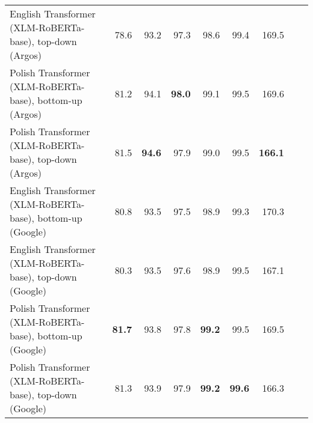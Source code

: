 \begin{table}[ht!]
{\begin{tabular}{lrrrrrrrr}
  English Transformer (XLM-RoBERTa-base), top-down (Argos) & 78.6 & 93.2 & 97.3 & 98.6 & 99.4 & 169.5 \\ 
  Polish Transformer (XLM-RoBERTa-base), bottom-up (Argos) & 81.2 & 94.1 & \textbf{98.0} & 99.1 & 99.5 & 169.6 \\ 
  Polish Transformer (XLM-RoBERTa-base), top-down (Argos) & 81.5 & \textbf{94.6} & 97.9 & 99.0 & 99.5 & \textbf{166.1} \\ 
  English Transformer (XLM-RoBERTa-base), bottom-up (Google) & 80.8 & 93.5 & 97.5 & 98.9 & 99.3 & 170.3 \\ 
  English Transformer (XLM-RoBERTa-base), top-down (Google) & 80.3 & 93.5 & 97.6 & 98.9 & 99.5 & 167.1 \\ 
  Polish Transformer (XLM-RoBERTa-base), bottom-up (Google) & \textbf{81.7} & 93.8 & 97.8 & \textbf{99.2} & 99.5 & 169.5 \\ 
  Polish Transformer (XLM-RoBERTa-base), top-down (Google) & 81.3 & 93.9 & 97.9 & \textbf{99.2} & \textbf{99.6} & 166.3 \\ 
   \hline
\end{tabular}
}
\end{table}




